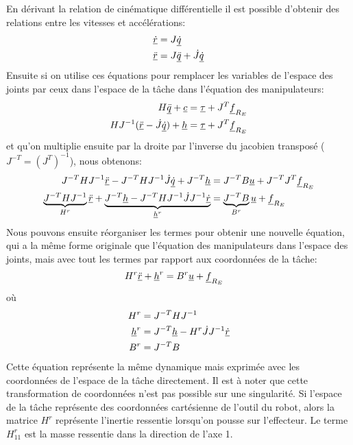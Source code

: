 En dérivant la relation de cinématique différentielle il est possible d'obtenir des relations entre les vitesses et accélérations:
\begin{align}
\underline{\dot{r}} &= J \underline{\dot{q}} \\
\underline{\ddot{r}} &= J \underline{\ddot{q}}  + \dot{J} \underline{\dot{q}} 
\end{align}
Ensuite si on utilise ces équations pour remplacer les variables de l'espace des joints par ceux dans l'espace de la tâche dans l'équation des manipulateurs:
\begin{align}
H \underline{\ddot{q}} + \underline{c} &= \underline{\tau} + J^T \underline{f}_{R_E} \\
H J^{-1} (\underline{\ddot{r}} - \dot{J} \underline{\dot{q}}) + \underline{h} &= \underline{\tau} + J^T \underline{f}_{R_E}
\end{align}
et qu'on multiplie ensuite par la droite par l'inverse du jacobien transposé ($J^{-T}=(J^T)^{-1}$), nous obtenons:
\begin{align}
J^{-T} H J^{-1} \underline{\ddot{r}} -  J^{-T} H J^{-1} \dot{J} \underline{\dot{q}} + J^{-T} \underline{h} &= J^{-T} B \underline{u} + J^{-T} J^T \underline{f}_{R_E} \\
\underbrace{
J^{-T} H J^{-1} 
}_{H^r}
\underline{\ddot{r}} +  
\underbrace{
J^{-T} \underline{h} 
-
J^{-T} H J^{-1} \dot{J} J^{-1} 
\underline{\dot{r}} 
}_{\underline{h}^r}
&= 
\underbrace{
J^{-T} 
B
}_{B^r}
\underline{u} + \underline{f}_{R_E} 
\end{align}
Nous pouvons ensuite réorganiser les termes pour obtenir une nouvelle équation, qui a la même forme originale que l'équation des manipulateurs dans l'espace des joints, mais avec tout les termes par rapport aux coordonnées de la tâche:
\begin{align}
H^r
\underline{\ddot{r}} +  
\underline{h}^r
&= B^{r} \underline{u} + \underline{f}_{R_E} 
\end{align}
où
\begin{align}
H^r & = J^{-T} H J^{-1} \\
\underline{h}^r & = J^{-T} \underline{h}  - H^r \dot{J} J^{-1} \underline{\dot{r}}  \\
B^r & = J^{-T} B
\end{align}
Cette équation représente la même dynamique mais exprimée avec les coordonnées de l'espace de la tâche directement. Il est à noter que cette transformation de coordonnées n'est pas possible sur une singularité. Si l'espace de la tâche représente des coordonnées cartésienne de l'outil du robot, alors la matrice $H^r$ représente l'inertie ressentie lorsqu'on pousse sur l'effecteur. Le terme $H^r_{11}$ est la masse ressentie dans la direction de l'axe 1. 




